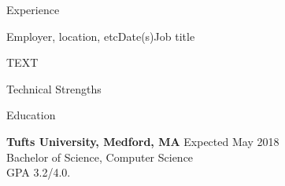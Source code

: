 \documentclass{resume} %
\begin{document}

\begin{rSection}{Experience}

\begin{rSubsection}{Employer, location, etc}{Date(s)}{Job title}

\item TEXT

\end{rSubsection}

\end{rSection}


\begin{rSection}{Technical Strengths}

\end{rSection}


\begin{rSection}{Education}

{\bf Tufts University, Medford, MA} \hfill {Expected May 2018} \\
Bachelor of Science, Computer Science \\
GPA 3.2/4.0. \smallskip

\end{rSection}
\end{document}
